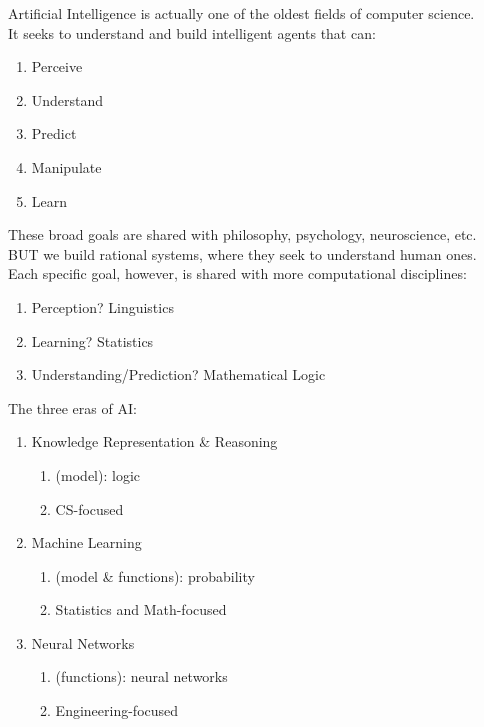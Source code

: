 \documentclass[../../lecture_notes.tex]{subfiles}
\begin{document}
\noindent Artificial Intelligence is actually one of the oldest fields of computer science.\\
It seeks to understand and build intelligent agents that can:
\begin{enumerate}
	\item Perceive
	\item Understand
	\item Predict
	\item Manipulate
	\item Learn
\end{enumerate}

\noindent These broad goals are shared with philosophy, psychology, neuroscience, etc.\\
\indent BUT we build rational systems, where they seek to understand human ones.\\

\noindent Each specific goal, however, is shared with more computational disciplines:
	\begin{enumerate} [itemsep=0mm]
		\item Perception? Linguistics
		\item Learning? Statistics
		\item Understanding/Prediction? Mathematical Logic
	\end{enumerate}

\noindent The three eras of AI:
\begin{enumerate} [itemsep=0mm]
	\item Knowledge Representation \& Reasoning
		\begin{enumerate} [itemsep=0mm]
        			\item (model): logic
        			\item CS-focused
		\end{enumerate}
	\item Machine Learning
		\begin{enumerate} [itemsep=0mm]
			\item (model \& functions): probability
			\item Statistics and Math-focused
		\end{enumerate}
	\item Neural Networks
		\begin{enumerate} [itemsep=0mm]
			\item (functions): neural networks
			\item Engineering-focused
		\end{enumerate}
\end{enumerate}
\end{document}
